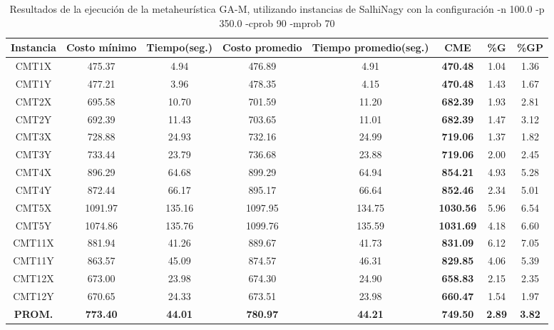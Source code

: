 \begin{table}[h]
\caption{Resultados de la ejecución de la metaheurística GA-M, utilizando instancias de SalhiNagy con la configuración -n 100.0 -p 350.0 -cprob 90 -mprob 70}
\centering
\small
\begin{tabular}{c c c c c c c c}
\hline\hline
Instancia & Costo mínimo & Tiempo(seg.) & Costo promedio & Tiempo promedio(seg.) & CME & \%G & \%GP \\ [0.5ex]
\hline
CMT1X & 475.37 & 4.94 & 
476.89 & 4.91 & \bf{470.48} & 
1.04 & 1.36\\CMT1Y & 477.21 & 3.96 & 
478.35 & 4.15 & \bf{470.48} & 
1.43 & 1.67\\CMT2X & 695.58 & 10.70 & 
701.59 & 11.20 & \bf{682.39} & 
1.93 & 2.81\\CMT2Y & 692.39 & 11.43 & 
703.65 & 11.01 & \bf{682.39} & 
1.47 & 3.12\\CMT3X & 728.88 & 24.93 & 
732.16 & 24.99 & \bf{719.06} & 
1.37 & 1.82\\CMT3Y & 733.44 & 23.79 & 
736.68 & 23.88 & \bf{719.06} & 
2.00 & 2.45\\CMT4X & 896.29 & 64.68 & 
899.29 & 64.94 & \bf{854.21} & 
4.93 & 5.28\\CMT4Y & 872.44 & 66.17 & 
895.17 & 66.64 & \bf{852.46} & 
2.34 & 5.01\\CMT5X & 1091.97 & 135.16 & 
1097.95 & 134.75 & \bf{1030.56} & 
5.96 & 6.54\\CMT5Y & 1074.86 & 135.76 & 
1099.76 & 135.59 & \bf{1031.69} & 
4.18 & 6.60\\CMT11X & 881.94 & 41.26 & 
889.67 & 41.73 & \bf{831.09} & 
6.12 & 7.05\\CMT11Y & 863.57 & 45.09 & 
874.57 & 46.31 & \bf{829.85} & 
4.06 & 5.39\\CMT12X & 673.00 & 23.98 & 
674.30 & 24.90 & \bf{658.83} & 
2.15 & 2.35\\CMT12Y & 670.65 & 24.33 & 
673.51 & 23.98 & \bf{660.47} & 
1.54 & 1.97\\\bf{PROM.} & 
\bf{773.40} & \bf{44.01} & \bf{780.97} & \bf{44.21} & \bf{749.50} & \bf{2.89} & \bf{3.82}\\[1ex]\hline
\end{tabular}
\label{table:GA-M-90-70}
\end{table} 